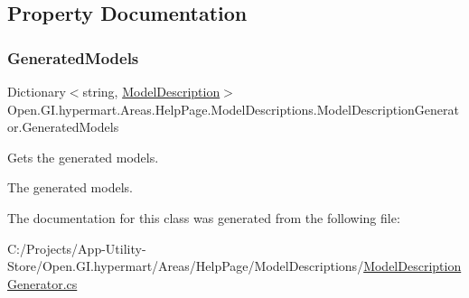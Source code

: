 \subsection{Property Documentation}
\hypertarget{class_open_1_1_g_i_1_1hypermart_1_1_areas_1_1_help_page_1_1_model_descriptions_1_1_model_description_generator_ad4d703c3da52e11a1e52c12ae04e88a6}{}\label{class_open_1_1_g_i_1_1hypermart_1_1_areas_1_1_help_page_1_1_model_descriptions_1_1_model_description_generator_ad4d703c3da52e11a1e52c12ae04e88a6} 
\subsubsection{\texorpdfstring{Generated\+Models}{GeneratedModels}}
{\footnotesize\ttfamily Dictionary$<$string, \hyperlink{class_open_1_1_g_i_1_1hypermart_1_1_areas_1_1_help_page_1_1_model_descriptions_1_1_model_description}{Model\+Description}$>$ Open.\+G\+I.\+hypermart.\+Areas.\+Help\+Page.\+Model\+Descriptions.\+Model\+Description\+Generator.\+Generated\+Models\hspace{0.3cm}{\ttfamily [get]}}



Gets the generated models. 

The generated models. 

The documentation for this class was generated from the following file\+:\begin{DoxyCompactItemize}
\item 
C\+:/\+Projects/\+App-\/\+Utility-\/\+Store/\+Open.\+G\+I.\+hypermart/\+Areas/\+Help\+Page/\+Model\+Descriptions/\hyperlink{_model_description_generator_8cs}{Model\+Description\+Generator.\+cs}\end{DoxyCompactItemize}
